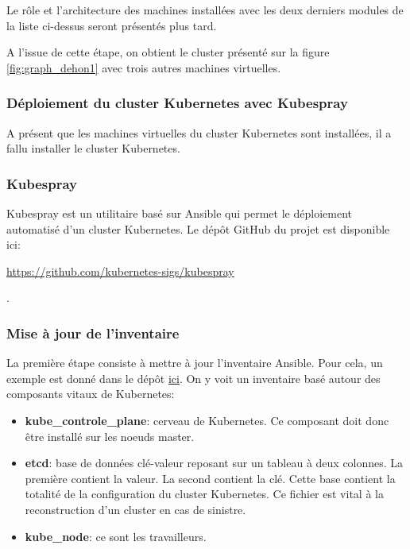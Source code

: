 \documentclass[12pt, a4paper, twoside]{article}
\begin{document}
Le rôle et l'architecture des machines installées avec les deux derniers modules de la liste ci-dessus seront présentés plus tard.

A l'issue de cette étape, on obtient le \gls{cluster} présenté sur la figure \ref{fig:graph_dehon1} avec trois autres machines virtuelles.

\subsubsection{Déploiement du cluster Kubernetes avec Kubespray}
A présent que les machines virtuelles du \gls{cluster} \gls{Kubernetes} sont installées, il a fallu installer le \gls{cluster} \gls{Kubernetes}.

\subsubsection{Kubespray}
\gls{Kubespray} est un utilitaire basé sur \gls{Ansible} qui permet le déploiement automatisé d'un \gls{cluster} \gls{Kubernetes}.
Le dépôt GitHub du projet est disponible ici: \\ \begin{hilite}\url{https://github.com/kubernetes-sigs/kubespray}\end{hilite}.

\subsubsection{Mise à jour de l'inventaire}
La première étape consiste à mettre à jour l'inventaire \gls{Ansible}.
Pour cela, un exemple est donné dans le dépôt \href{https://github.com/kubernetes-sigs/kubespray/blob/master/inventory/sample/inventory.ini}{ici}.
On y voit un inventaire basé autour des composants vitaux de \gls{Kubernetes}:
\begin{itemize}
    \item \textbf{kube\_controle\_plane}: cerveau de \gls{Kubernetes}.
    Ce composant doit donc être installé sur les noeuds master.
    \item \textbf{etcd}: base de données clé-valeur reposant sur un tableau à deux colonnes.
    La première contient la valeur.
    La second contient la clé.
    Cette base contient la totalité de la configuration du \gls{cluster} \gls{Kubernetes}.
    Ce fichier est vital à la reconstruction d'un \gls{cluster} en cas de sinistre.
    \item \textbf{kube\_node}: ce sont les travailleurs.
\end{itemize}
\end{document}
